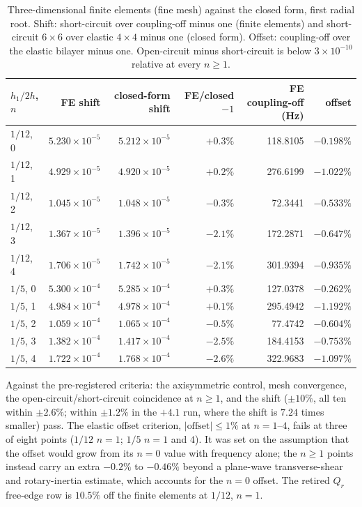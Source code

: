 \documentclass[11pt]{article}
\begin{document}
\begin{table}[ht]
\centering
\caption{Three-dimensional finite elements (fine mesh) against the
closed form, first radial root. Shift: short-circuit over coupling-off
minus one (finite elements) and short-circuit $6\times6$ over elastic
$4\times4$ minus one (closed form). Offset: coupling-off over the
elastic bilayer minus one. Open-circuit minus short-circuit is below
$3\times10^{-10}$ relative at every $n\ge1$.}
\label{tab:s9}
\small
\begin{tabular}{@{}lrrrrr@{}}
\toprule
$h_1/2h$, $n$ & FE shift & closed-form shift & FE/closed $-1$ & FE coupling-off (Hz) & offset \\
\midrule
$1/12$, 0 & $5.230\times10^{-5}$ & $5.212\times10^{-5}$ & $+0.3\%$ & 118.8105 & $-0.198\%$ \\
$1/12$, 1 & $4.929\times10^{-5}$ & $4.920\times10^{-5}$ & $+0.2\%$ & 276.6199 & $-1.022\%$ \\
$1/12$, 2 & $1.045\times10^{-5}$ & $1.048\times10^{-5}$ & $-0.3\%$ & 72.3441 & $-0.533\%$ \\
$1/12$, 3 & $1.367\times10^{-5}$ & $1.396\times10^{-5}$ & $-2.1\%$ & 172.2871 & $-0.647\%$ \\
$1/12$, 4 & $1.706\times10^{-5}$ & $1.742\times10^{-5}$ & $-2.1\%$ & 301.9394 & $-0.935\%$ \\
$1/5$, 0 & $5.300\times10^{-4}$ & $5.285\times10^{-4}$ & $+0.3\%$ & 127.0378 & $-0.262\%$ \\
$1/5$, 1 & $4.984\times10^{-4}$ & $4.978\times10^{-4}$ & $+0.1\%$ & 295.4942 & $-1.192\%$ \\
$1/5$, 2 & $1.059\times10^{-4}$ & $1.065\times10^{-4}$ & $-0.5\%$ & 77.4742 & $-0.604\%$ \\
$1/5$, 3 & $1.382\times10^{-4}$ & $1.417\times10^{-4}$ & $-2.5\%$ & 184.4153 & $-0.753\%$ \\
$1/5$, 4 & $1.722\times10^{-4}$ & $1.768\times10^{-4}$ & $-2.6\%$ & 322.9683 & $-1.097\%$ \\
\bottomrule
\end{tabular}
\end{table}

Against the pre-registered criteria: the axisymmetric control, mesh
convergence, the open-circuit/short-circuit coincidence at $n\ge1$, and
the shift ($\pm10\%$, all ten within $\pm2.6\%$; within $\pm1.2\%$ in the
$+4.1$ run, where the shift is $7.24$ times smaller) pass. The elastic
offset criterion, $|\text{offset}|\le1\%$ at $n=1$--$4$, fails at three
of eight points ($1/12$ $n=1$; $1/5$ $n=1$ and $4$). It was set on the
assumption that the offset would grow from its $n=0$ value with
frequency alone; the $n\ge1$ points instead carry an extra $-0.2\%$ to
$-0.46\%$ beyond a plane-wave transverse-shear and rotary-inertia
estimate, which accounts for the $n=0$ offset. The retired $Q_r$
free-edge row is $10.5\%$ off the finite elements at $1/12$, $n=1$.
\end{document}
